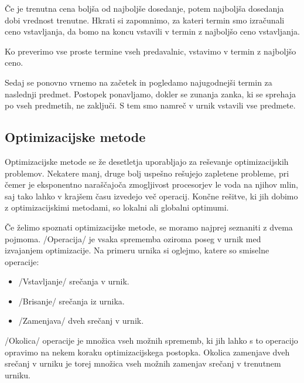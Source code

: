 \documentclass[10pt,a4paper]{article}
\begin{document}
   Če je trenutna cena boljša od najboljše dosedanje, potem najboljša dosedanja
   dobi vrednost trenutne. Hkrati si zapomnimo, za kateri termin smo izračunali ceno
   vstavljanja, da bomo  na koncu vstavili v termin z najboljšo
   ceno vstavljanja.

   Ko preverimo vse proste termine vseh predavalnic, vstavimo 
   v termin z najboljšo ceno.

   Sedaj se ponovno vrnemo na začetek in pogledamo najugodnejši termin za naslednji
   predmet. Postopek ponavljamo, dokler se zunanja zanka, ki se sprehaja po vseh predmetih,
   ne zaključi. S tem smo namreč v urnik vstavili vse predmete.

\subsection{Optimizacijske metode} %

Optimizacijske metode se že desetletja uporabljajo za reševanje optimizacijskih problemov.
Nekatere manj, druge bolj uspešno rešujejo zapletene probleme, pri čemer je eksponentno
naraščajoča zmogljivost procesorjev le voda na njihov mlin, saj tako lahko v krajšem
času izvedejo več operacij. Končne rešitve, ki jih dobimo z optimizacijskimi metodami,
so lokalni ali globalni optimumi.

Če želimo spoznati optimizacijske metode, se moramo najprej seznaniti z dvema pojmoma.
/Operacija/ je vsaka sprememba oziroma poseg v urnik med izvajanjem optimizacije.
Na primeru urnika si oglejmo, katere so smiselne operacije:

\begin{itemize}
  \item  /Vstavljanje/ srečanja v urnik.
  \item  /Brisanje/ srečanja iz urnika.
  \item  /Zamenjava/ dveh srečanj v urnik.
\end{itemize}

/Okolica/ operacije je množica vseh možnih sprememb, ki jih lahko s to operacijo
opravimo na nekem koraku optimizacijskega postopka. Okolica zamenjave dveh srečanj v urniku
je torej množica vseh možnih zamenjav srečanj v trenutnem urniku.
\end{document}
